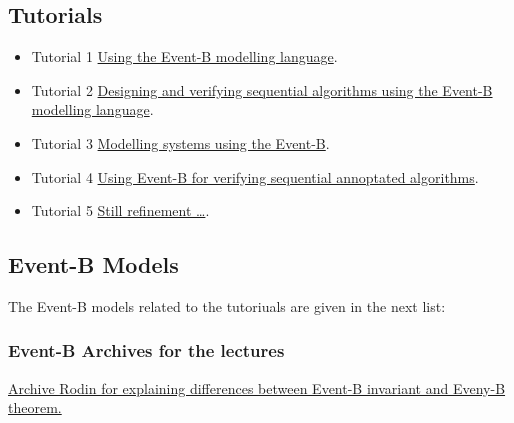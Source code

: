 \documentclass[ 12pt]{article}
\begin{document}
      
  
\subsection{Tutorials}

  \begin{itemize}
  \item[]   Tutorial 1
    \href{http://mery54.github.io/teaching/mosos/lecturesnotes/master-tutorial1.pdf}{Using 
      the Event-B modelling language}.

     \item[]   Tutorial 2
    \href{http://mery54.github.io/teaching/mosos/lecturesnotes/master-tutorial2.pdf}{
      Designing and verifying sequential algorithms using the Event-B
      modelling language}.

        \item[]   Tutorial 3
    \href{http://mery54.github.io/teaching/mosos/lecturesnotes/master-tutorial3.pdf}{
      Modelling   systems  using the Event-B}.

   \item[]   Tutorial 4
    \href{http://mery54.github.io/teaching/mosos/lecturesnotes/master-tutorial4.pdf}{
      Using  Event-B  for  verifying sequential  annoptated algorithms}.


  
   \item[]   Tutorial 5
    \href{http://mery54.github.io/teaching/mosos/lecturesnotes/master-tutorial5.pdf}{
      Still refinement \ldots}.

  
    
  \end{itemize}



  \subsection{Event-B Models}
\label{sec:event-b-models}


The Event-B models related to the tutoriuals are given in the next list: 

\subsubsection{Event-B Archives for the  lectures}

 \href{http://mery54.github.io/teaching/mosos/lecturesnotes/
   ex-safety.zip}{Archive Rodin  for  explaining differences between
   Event-B invariant and Eveny-B theorem. }
\end{document}
